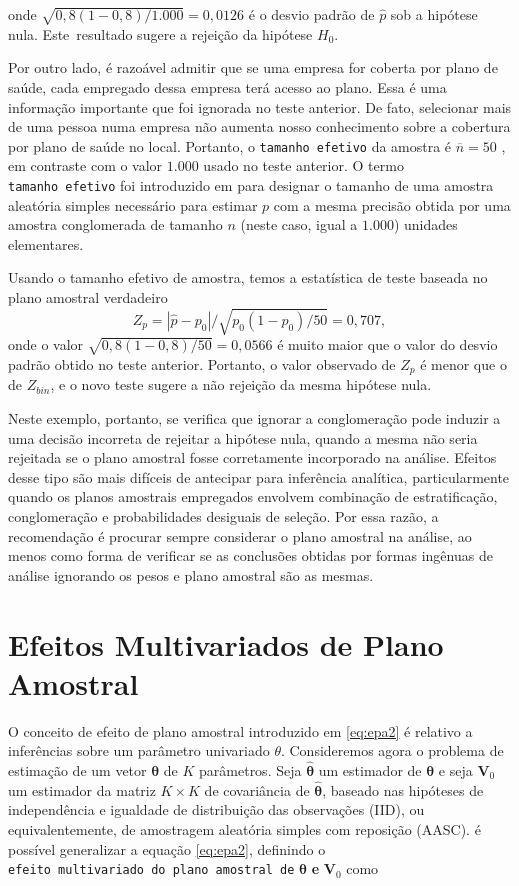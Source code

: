 \documentclass[]{book}
\numberwithin{example}{chapter}
\numberwithin{remark}{chapter}
\numberwithin{definition}{chapter}
\begin{document}
onde \(\sqrt{0,8\left( 1-0,8\right) /1.000}=0,0126\) é o desvio padrão
de \(\widehat{p}\) sob a hipótese nula. Este~resultado sugere a rejeição
da hipótese \(H_{0}\).

Por outro lado, é razoável admitir que se uma empresa for coberta por
plano de saúde, cada empregado dessa empresa terá acesso ao plano. Essa
é uma informação importante que foi ignorada no teste anterior. De fato,
selecionar mais de uma pessoa numa empresa não aumenta nosso
conhecimento sobre a cobertura por plano de saúde no local. Portanto, o
\texttt{tamanho\ efetivo} da amostra é \(\overline{n}=50\) , em
contraste com o valor \(1.000\) usado no teste anterior. O termo
\texttt{tamanho\ efetivo} foi introduzido em \citep{Kish65} para
designar o tamanho de uma amostra aleatória simples necessário para
estimar \(p\) com a mesma precisão obtida por uma amostra conglomerada
de tamanho \(n\) (neste caso, igual a \(1.000\)) unidades elementares.

Usando o tamanho efetivo de amostra, temos a estatística de teste
baseada no plano amostral verdadeiro \[
Z_{p}=|\widehat{p}-p_{0}|/\sqrt{p_{0}\left( 1-p_{0}\right) /50}=0,707 ,
\] onde o valor \(\sqrt{0,8\left( 1-0,8\right) /50}=0,0566\) é muito
maior que o valor do desvio padrão obtido no teste anterior. Portanto, o
valor observado de \(Z_{p}\) é menor que o de \(Z_{bin}\), e o novo
teste sugere a não rejeição da mesma hipótese nula.

Neste exemplo, portanto, se verifica que ignorar a conglomeração pode
induzir a uma decisão incorreta de rejeitar a hipótese nula, quando a
mesma não seria rejeitada se o plano amostral fosse corretamente
incorporado na análise. Efeitos desse tipo são mais difíceis de
antecipar para inferência analítica, particularmente quando os planos
amostrais empregados envolvem combinação de estratificação,
conglomeração e probabilidades desiguais de seleção. Por essa razão, a
recomendação é procurar sempre considerar o plano amostral na análise,
ao menos como forma de verificar se as conclusões obtidas por formas
ingênuas de análise ignorando os pesos e plano amostral são as mesmas.

\section{Efeitos Multivariados de Plano
Amostral}\label{efeitos-multivariados-de-plano-amostral}

O conceito de efeito de plano amostral introduzido em \eqref{eq:epa2} é
relativo a inferências sobre um parâmetro univariado \(\theta\).
Consideremos agora o problema de estimação de um vetor
\(\mathbf{\theta}\) de \(K\) parâmetros. Seja \(\mathbf{\hat{\theta}}\)
um estimador de \(\mathbf{\theta}\) e seja \(\mathbf{V}_{0}\) um
estimador da matriz \(K\times K\) de covariância de
\(\mathbf{\hat{\theta}}\), baseado nas hipóteses de independência e
igualdade de distribuição das observações (IID), ou equivalentemente, de
amostragem aleatória simples com reposição (AASC). é possível
generalizar a equação \eqref{eq:epa2}, definindo o
\texttt{efeito\ multivariado\ do\ plano\ amostral\ de}
\(\mathbf{\hat{\theta}}\) \textbf{e} \(\mathbf{V}_{0}\) como
\end{document}
